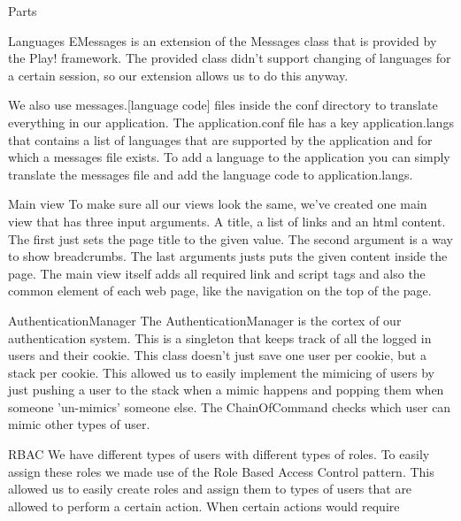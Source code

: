 \documentclass[]{article}
\begin{document}
\begin{section}{Parts}
    \begin{subsection}{Languages}
        EMessages is an extension of the Messages class that is provided by the Play!
        framework. The provided class didn't support changing of languages for a certain
        session, so our extension allows us to do this anyway.
        
        We also use messages.[language code] files inside the conf directory to translate
        everything in our application. The application.conf file has a key application.langs
        that contains a list of languages that are supported by the application and
        for which a messages file exists. To add a language to the application you can simply
        translate the messages file and add the language code to application.langs.
    \end{subsection}
    \begin{subsection}{Main view}
        To make sure all our views look the same, we've created one main view that has three
        input arguments. A title, a list of links and an html content. The first just sets
        the page title to the given value. The second argument is a way to show breadcrumbs.
				The last arguments justs puts the given content inside the page.
        The main view itself adds all required link and script tags and also the common
        element of each web page, like the navigation on the top of the page.
    \end{subsection}
    \begin{subsection}{AuthenticationManager}
        The AuthenticationManager is the cortex of our authentication system. This is a
        singleton that keeps track of all the logged in users and their cookie.
        This class doesn't just save one user per cookie, but a stack per cookie. This
        allowed us to easily implement the mimicing of users by just pushing a user to
        the stack when a mimic happens and popping them when someone 'un-mimics' someone
        else.
        The ChainOfCommand checks which user can mimic other types of user.
    \end{subsection}
    \begin{subsection}{RBAC}
        We have different types of users with different types of roles. To easily
        assign these roles we made use of the Role Based Access Control pattern.
        This allowed us to easily create roles and assign them to types of users
        that are allowed to perform a certain action. When certain actions would require

\end{subsection}
\end{section}
\end{document}
